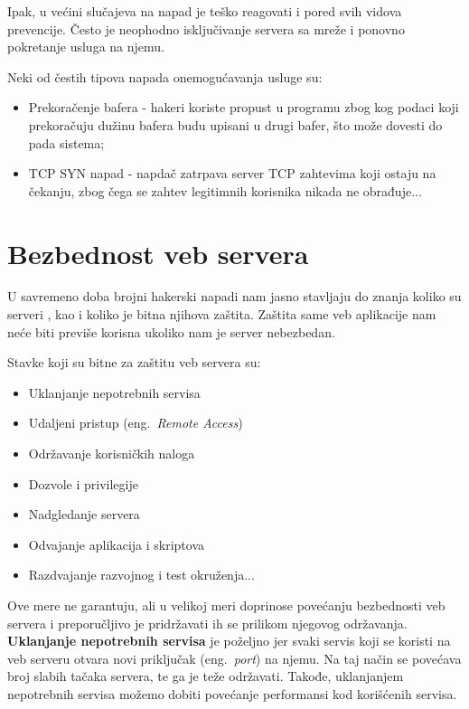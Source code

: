 \documentclass[a4paper]{article}
\begin{document}
Ipak, u većini slučajeva  na napad je teško reagovati i pored svih vidova prevencije. Često je neophodno isključivanje servera sa mreže i ponovno pokretanje usluga na njemu.

Neki od čestih tipova napada onemogućavanja usluge \cite{DoS} su: 
\begin{itemize}
	\item Prekoračenje bafera - hakeri koriste propust u programu zbog kog podaci koji prekoračuju dužinu bafera budu upisani u drugi bafer, što može dovesti do pada sistema;
	\item TCP SYN napad - napdač zatrpava server TCP zahtevima koji ostaju na čekanju, zbog čega se zahtev legitimnih korisnika nikada ne obrađuje...
\end{itemize}

\section{Bezbednost veb servera} \label{server}

U savremeno doba brojni hakerski napadi nam jasno stavljaju do znanja koliko su serveri , kao i koliko je bitna njihova zaštita. Zaštita same veb aplikacije nam neće biti previše korisna ukoliko nam je server nebezbedan.

Stavke koji su bitne za zaštitu veb servera su:
\begin{itemize}
	\item Uklanjanje nepotrebnih servisa
	\item Udaljeni pristup (eng.~{\em Remote Access})
	\item Održavanje korisničkih naloga
	\item Dozvole i privilegije
	\item Nadgledanje servera
	\item Odvajanje aplikacija i skriptova
	\item Razdvajanje razvojnog i test okruženja...
\end{itemize}
Ove mere ne garantuju, ali u velikoj meri doprinose povećanju bezbednosti veb servera i preporučljivo je pridržavati ih se prilikom njegovog održavanja.\\

\textbf{Uklanjanje nepotrebnih servisa} je poželjno jer svaki servis koji se koristi na veb serveru otvara novi priključak (eng.~{\em port}) na njemu. Na taj način se povećava broj slabih tačaka servera, te ga je teže održavati. Takođe, uklanjanjem nepotrebnih servisa možemo dobiti povećanje performansi kod korišćenih servisa.
\end{document}
